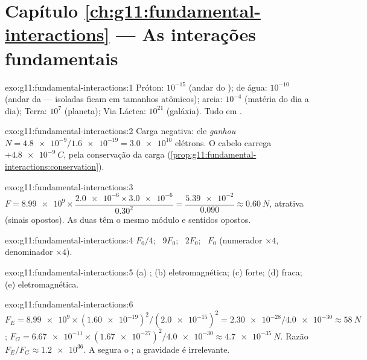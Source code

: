 \section*{Capítulo \ref{ch:g11:fundamental-interactions} --- As interações fundamentais}

\begin{solution}{exo:g11:fundamental-interactions:1}
Próton: $10^{-15}$ (andar do );  de água: $10^{-10}$
(andar da  ---  isoladas ficam em tamanhos atômicos);
areia: $10^{-4}$ (matéria do dia a dia); Terra: $10^{7}$ (planeta); Via
Láctea: $10^{21}$ (galáxia). Tudo em .
\end{solution}

\begin{solution}{exo:g11:fundamental-interactions:2}
Carga negativa: ele \emph{ganhou}
$N = \num{4.8e-9}/\num{1.6e-19} = \num{3.0e10}$ elétrons. O cabelo
carrega $+\qty{4.8e-9}{C}$, pela conservação da carga
(\cref{prop:g11:fundamental-interactions:conservation}).
\end{solution}

\begin{solution}{exo:g11:fundamental-interactions:3}
$F = \num{8.99e9} \times \dfrac{\num{2.0e-6} \times \num{3.0e-6}}{0.30^2}
= \dfrac{\num{5.39e-2}}{0.090} \approx \qty{0.60}{N}$, atrativa (sinais
opostos). As duas  têm o mesmo módulo e sentidos opostos.
\end{solution}

\begin{solution}{exo:g11:fundamental-interactions:4}
$F_0/4$; \ $9F_0$; \ $2F_0$; \ $F_0$ (numerador $\times 4$, denominador
$\times 4$).
\end{solution}

\begin{solution}{exo:g11:fundamental-interactions:5}
(a) ; (b) eletromagnética; (c) forte; (d) fraca;
(e) eletromagnética.
\end{solution}

\begin{solution}{exo:g11:fundamental-interactions:6}
$F_E = \num{8.99e9} \times (\num{1.60e-19})^2/(\num{2.0e-15})^2
= \num{2.30e-28}/\num{4.0e-30} \approx \qty{58}{N}$;
$F_G = \num{6.67e-11} \times (\num{1.67e-27})^2/\num{4.0e-30}
\approx \qty{4.7e-35}{N}$. Razão $F_E/F_G \approx \num{1.2e36}$. A
 segura o ; a gravidade é irrelevante.
\end{solution}

